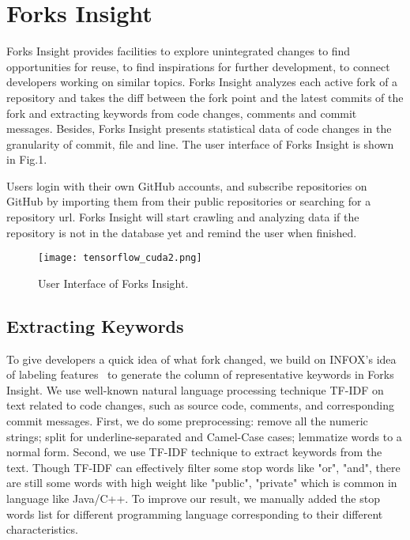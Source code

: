 \section{Forks Insight}

Forks Insight provides facilities to explore unintegrated changes to find opportunities for reuse, to find inspirations for further development, to connect developers working on similar topics.
%
Forks Insight analyzes each active fork of a repository and takes the diff between the fork point and the latest commits   of the fork and extracting keywords from code changes, comments and commit messages.
%
Besides, Forks Insight presents statistical data of code changes in the granularity of commit, file and line. The user interface of Forks Insight is shown in Fig.1. 

Users login with their own GitHub accounts, and subscribe repositories on GitHub by importing them from their public repositories or searching for a repository url. Forks Insight will start crawling and analyzing data if the repository is not in the database yet and remind the user when finished.

\begin{figure*}[ht]
\texttt{[image: tensorflow\_cuda2.png]}
\caption{User Interface of Forks Insight.}
\vspace{-6pt}
\label{GUI}
\end{figure*}

\subsection{Extracting Keywords}
To give developers a quick idea of what fork changed, we build on INFOX's idea of labeling features~\cite{ZSLXWK:ICSE18}
to generate the column of representative keywords in Forks Insight. We use well-known natural language processing technique TF-IDF \cite{salton1988term} on text related to code changes, such as source code, comments, and corresponding commit messages. First, we do some preprocessing: remove all the numeric strings; split for underline-separated and Camel-Case cases; lemmatize words to a normal form. Second, we use TF-IDF technique to extract keywords from the text. Though TF-IDF can effectively filter some stop words like "or", "and", there are still some words with high weight like "public", "private" which is common in language like Java/C++. To improve our result, we manually added the stop words list for different programming language corresponding to their different characteristics.

